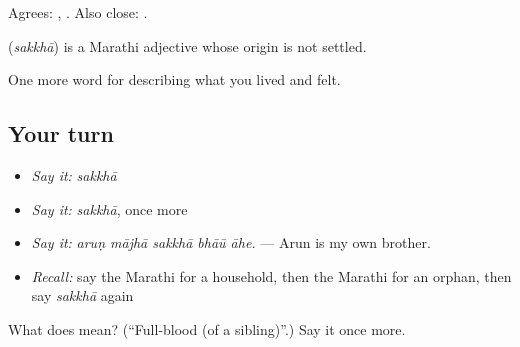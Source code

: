 Agrees:  ,  . Also close:  .

\begin{cousinweb}
\textbf{} (\emph{sakkhā}) is a Marathi adjective whose origin is not settled.
\end{cousinweb}

\begin{grammarlens}[title={What you've built}]
One more word for describing what you lived and felt.
\end{grammarlens}

\subsection*{Your turn}
\begin{itemize}
\raggedright
  \item \emph{Say it:} \emph{sakkhā}
  \item \emph{Say it:} \emph{sakkhā}, once more
  \item \emph{Say it:} \emph{aruṇ mājhā sakkhā bhāū āhe.} — Arun is my own brother.
  \item \emph{Recall:} say the Marathi for a household, then the Marathi for an orphan, then say \emph{sakkhā} again
\end{itemize}

\begin{tcolorbox}[breakable,colback=teal!4,colframe=teal!35!black,title={Before you move on}]
What does  mean? (\textquotedblleft{}Full-blood (of a sibling)\textquotedblright{}.) Say it once more.
\end{tcolorbox}
